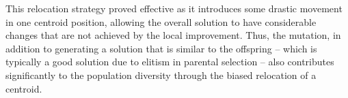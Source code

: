 This relocation strategy proved effective as it introduces some drastic movement in one centroid position, allowing the overall solution to have considerable changes that are not achieved by the local improvement. Thus, the mutation, in addition to generating a solution that is similar to the offspring -- which is typically a good solution due to elitism in parental selection -- also contributes significantly to the population diversity through the biased relocation of a centroid.


